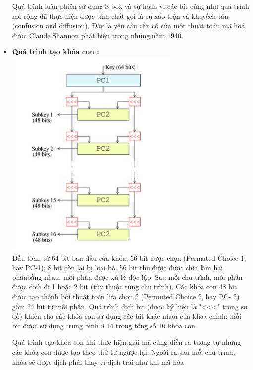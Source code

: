 \documentclass[paper=a4, fontsize=11pt]{scrartcl}	%
\numberwithin{equation}{section}															%
\numberwithin{figure}{section}																%
\numberwithin{table}{section}																%
\begin{document}
\begin{itemize}
\begin{itemize}
    \end{itemize}
   
Quá trình luân phiên sử dụng S-box và sự hoán vị các bít cũng như quá trình mở rộng đã thực hiện được tính chất gọi là sự xáo trộn và khuyếch tán (confusion and diffusion). Đây là yêu cầu cần có của một thuật toán mã hoá được Claude Shannon phát hiện trong những năm 1940.
    
    \item \textbf{Quá trình tạo khóa con :} \\
    \includegraphics{DES_KEY}\\
    Đầu tiên, từ 64 bit ban đầu của khóa, 56 bit được chọn (Permuted Choice 1, hay PC-1); 8 bit còn lại bị loại bỏ. 56 bit thu được được chia làm hai phầnbằng nhau, mỗi phần được xử lý độc lập. Sau mỗi chu trình, mỗi phần được dịch đi 1 hoặc 2 bit (tùy thuộc từng chu trình). Các khóa con 48 bit được tạo thành bởi thuật toán lựa chọn 2 (Permuted Choice 2, hay PC- 2) gồm 24 bit từ mỗi phần. Quá trình dịch bit (được ký hiệu là "<<<" trong sơ đồ) khiến cho các khóa con sử dụng các bit khác nhau của khóa chính; mỗi bit được sử dụng trung bình ở 14 trong tổng số 16 khóa con.
    
    Quá trình tạo khóa con khi thực hiện giải mã cũng diễn ra tương tự nhưng các khóa con được tạo theo thứ tự ngược lại. Ngoài ra sau mỗi chu trình, khóa sẽ được dịch phải thay vì dịch trái như khi mã hóa
\end{itemize}
\end{document}
